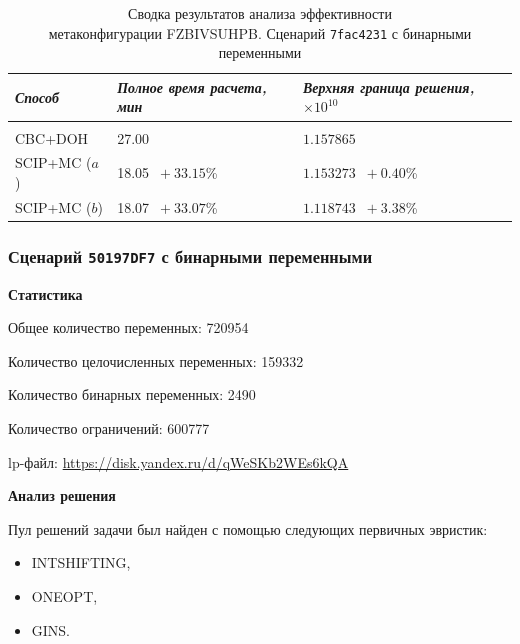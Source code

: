 \documentclass[%
	11pt,
	a4paper,
	utf8,
		]{article}
\begin{document}
{
	\begin{table}[!h]
		\centering
		\caption{Сводка результатов анализа эффективности\\метаконфигурации FZBIVSUHPB. Сценарий \texttt{7fac4231} с бинарными переменными}
		\begin{tabular}{ p{2.5cm} p{3.3cm} p{3.4cm} }
			\emph{Способ} & \emph{Полное время расчета, мин} & \emph{Верхняя граница решения, $ \times 10^{10} $} \\
			\hline\hline\\[-3.5mm]
			{CBC+DOH} & 27.00 & $ 1.157865 $ \\
			\hline
			SCIP+MC ($ a $) & 18.05 {\color{blue} $\ +33.15 $\%} & $ 1.153273 $ {\color{blue} $\ +0.40 $\%} \\
			\hline
			SCIP+MC ($ b $) & 18.07 {\color{blue} $\ +33.07 $\%} & $ 1.118743 $ {\color{blue} $\ +3.38 $\%} \\
		\end{tabular}\label{tab:7fac4231}
	\end{table}
}

\subsubsection{Сценарий \texttt{50197DF7} с бинарными переменными}

\textbf{Статистика}\vspace*{1mm}

Общее количество переменных: 720954

Количество целочисленных переменных: 159332

Количество бинарных переменных: 2490

Количество ограничений: 600777

lp-файл: \url{https://disk.yandex.ru/d/qWeSKb2WEs6kQA}

\vspace*{5mm}\textbf{Анализ решения}\vspace*{1mm}

Пул решений задачи был найден с помощью следующих первичных эвристик:
\begin{itemize}
	\item INTSHIFTING,
	
	\item ONEOPT,
	
	\item GINS.
\end{itemize}
\end{document}
